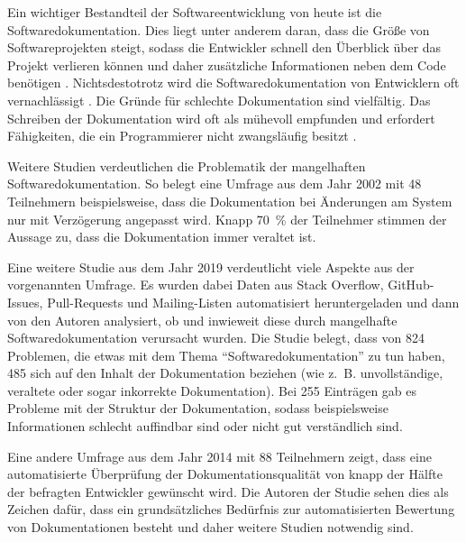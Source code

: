 \label{sec:introduction}

Ein wichtiger Bestandteil der Softwareentwicklung von heute ist die Softwaredokumentation. Dies liegt unter anderem daran, dass die Größe von Softwareprojekten steigt, sodass die Entwickler schnell den Überblick über das Projekt verlieren können und daher zusätzliche Informationen neben dem Code benötigen \cite[S.~1]{StaticAnalysis:AnIntroduction:TheFundamentalChallengeofSoftwareEngineeringisOneofComplexity.}. Nichtsdestotrotz wird die Softwaredokumentation von Entwicklern oft vernachlässigt \cite[S.~83]{Qualityanalysisofsourcecodecomments}.  Die Gründe für schlechte Dokumentation sind vielfältig. Das Schreiben der Dokumentation wird oft als mühevoll empfunden und erfordert Fähigkeiten, die ein Programmierer nicht zwangsläufig besitzt \cite[S.~70]{AutomaticQualityAssessmentofSourceCodeComments:TheJavadocMiner} \cite[S.~593]{Softwareengineeringandsoftwaredocumentation:aunifiedlongcourse}.  

Weitere Studien verdeutlichen die Problematik der mangelhaften Softwaredokumentation. So belegt eine Umfrage aus dem Jahr 2002 mit 48 Teilnehmern  beispielsweise, dass die Dokumentation  bei Änderungen am System  nur mit Verzögerung angepasst wird. Knapp 70~\% der Teilnehmer stimmen der Aussage zu, dass die Dokumentation immer veraltet ist.   \cite[S.~28--29]{TheRelevanceofSoftwareDocumentationToolsandTechnologies:ASurvey}

Eine weitere Studie  \cite[S.~1199--1208]{SoftwareDocumentationIssuesUnveiled} aus dem Jahr 2019 verdeutlicht viele Aspekte aus der vorgenannten Umfrage. Es wurden dabei Daten aus Stack Overflow, GitHub-Issues, Pull-Requests und Mailing-Listen automatisiert heruntergeladen und dann von den Autoren analysiert, ob und inwieweit diese durch mangelhafte Softwaredokumentation verursacht wurden.  Die Studie belegt, dass von 824 Problemen, die etwas mit dem Thema \enquote{Softwaredokumentation} zu tun haben, 485 sich auf den Inhalt der Dokumentation beziehen (wie z.~B. unvollständige, veraltete oder sogar inkorrekte Dokumentation). Bei 255 Einträgen gab es Probleme mit der Struktur der Dokumentation, sodass beispielsweise Informationen schlecht auffindbar sind oder nicht gut verständlich sind.


Eine andere Umfrage aus dem Jahr 2014 mit 88 Teilnehmern zeigt, dass eine automatisierte Überprüfung der Dokumentationsqualität von knapp der Hälfte der befragten Entwickler gewünscht wird. Die Autoren der Studie sehen dies als Zeichen dafür, dass ein grundsätzliches Bedürfnis zur automatisierten Bewertung von Dokumentationen besteht und daher weitere Studien notwendig sind. \cite[S.~340]{TheValueofSoftwareDocumentationQuality}

